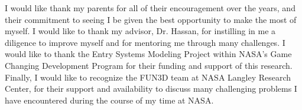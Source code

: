 \begin{acknowledgements}
I would like thank my parents for all of their encouragement over the years, and
their commitment to seeing I be given the best opportunity to make the most of
myself.  I would like to thank my advisor, Dr. Hassan, for instilling in me a
diligence to improve myself and for mentoring me through many challenges.  I
would like to thank the Entry Systems Modeling Project within NASA's Game
Changing Development Program for their funding and support of this research.
Finally, I would like to recognize the FUN3D team at NASA Langley Research
Center, for their support and availability to discuss many challenging problems
I have encountered during the course of my time at NASA.
\end{acknowledgements}

\thesistableofcontents

\thesislistoftables

\thesislistoffigures
